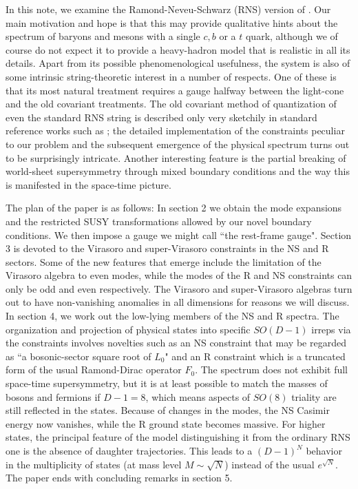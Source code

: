 \documentclass[a4paper,a4paper]{article}
\begin{document}
In this note, we examine the Ramond-Neveu-Schwarz (RNS) version of
\cite{Gursoy}.  Our  main motivation and hope is that this may
provide qualitative hints about the spectrum of baryons and mesons
with a single $c,b$ or a $t$ quark, although we of course do not expect
it to provide a heavy-hadron  model that is realistic in all its details.
Apart from its possible phenomenological usefulness, the system is
also of some intrinsic string-theoretic interest in a number of respects.
One of
these is that its most natural treatment requires a gauge halfway
between the light-cone and the old covariant treatments.  The old
covariant method of quantization of even the standard RNS string
is described only very sketchily in standard reference works such
as \cite{GSW,Pol,Pol2}; the detailed implementation of the constraints
peculiar to our problem  and the subsequent emergence of the physical
spectrum turns out to be surprisingly intricate.  Another
interesting feature is the partial breaking of world-sheet
supersymmetry through mixed boundary conditions and the way this
is manifested in the space-time picture.

The plan of the paper is as follows: In section 2 we obtain the
mode expansions and the restricted SUSY transformations allowed by
our novel boundary conditions.  We then impose a gauge we might
call ``the rest-frame gauge". Section 3 is devoted to the Virasoro
and super-Virasoro constraints in the NS and R sectors.  Some of
the new features that emerge include the limitation of the
Virasoro algebra to even modes, while the modes of the R and NS
constraints can only be odd and even respectively. The
Virasoro and super-Virasoro algebras turn out to have
non-vanishing anomalies in all dimensions for reasons we will
discuss.  In section 4, we work out the low-lying members of the
NS and R spectra.  The organization and projection of physical
states into specific $SO(D-1)$ irreps via the constraints involves
novelties such as an NS constraint that may be regarded as ``a
bosonic-sector square root of $L_0$" and an R constraint which is a
truncated form of the usual Ramond-Dirac operator $F_0$.  The
spectrum does not exhibit full space-time supersymmetry, but it is
at least possible to match the masses of bosons and fermions if
$D-1=8$, which means aspects of $SO(8)$ triality are still
reflected in the states. Because of changes in the modes, the NS
Casimir energy now vanishes, while the R ground state becomes massive.
For higher states, the principal feature
of the model distinguishing it from the ordinary RNS one  is the absence of
daughter trajectories.  This leads to a $(D-1)^N$ behavior in the
multiplicity of states (at mass level $M\sim \sqrt N$)  instead of
the usual $e^{\sqrt N}$. The paper ends with concluding remarks in
section 5.
\end{document}
